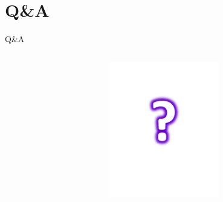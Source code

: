 \section{Q\&A}
\begin{frame}{Q\&A}
\begin{columns}
\begin{column}{0.6\textwidth}
\end{column}
\begin{column}{0.4\textwidth}
\includegraphics[width=4.8cm]{images/question.png}
\end{column}
\end{columns}
\end{frame}